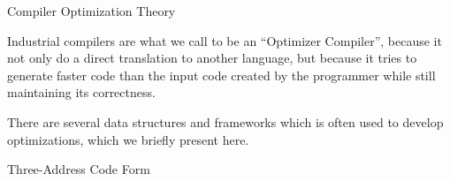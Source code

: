 \begin{section}{Compiler Optimization Theory}\label{sec:optimization}

Industrial compilers are what we call to be an ``Optimizer Compiler'', because
it not only do a direct translation to another language, but because it
tries to generate faster code than the input code created by the programmer
while still maintaining its correctness.

There are several data structures and frameworks which is often used to
develop optimizations, which we briefly present here.

%
%
%
%
%
%

\begin{subsection}{Three-Address Code Form}


\end{subsection}
\end{section}
